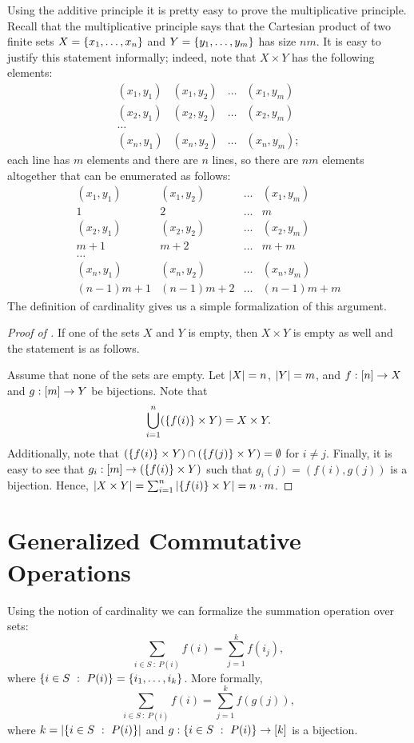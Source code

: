 Using the additive principle it is pretty easy to prove the multiplicative
principle. Recall that the multiplicative principle says that the Cartesian
product of two finite sets $X = \set{x_1, \dots, x_n}$ and 
$Y = \set{y_1, \dots, y_m}$ has size $nm$. It is easy to justify this statement
informally; indeed, note that $X \times Y$ has the following elements:
\[
  \begin{matrix}
    (x_1, y_1) & (x_1, y_2) & \dots & (x_1, y_m) \\
    (x_2, y_1) & (x_2, y_2) & \dots & (x_2, y_m) \\
    \dots \\
    (x_n, y_1) & (x_n, y_2) & \dots & (x_n, y_m);
  \end{matrix}
\]
each line has $m$ elements and there are $n$ lines, so there are $nm$ elements
altogether that can be enumerated as follows:
\[
  \begin{matrix}
    (x_1, y_1) & (x_1, y_2) & \dots & (x_1, y_m) \\
    1          & 2          & \dots & m \\
    (x_2, y_1) & (x_2, y_2) & \dots & (x_2, y_m) \\
    m + 1      & m + 2      & \dots & m + m \\
    \dots \\
    (x_n, y_1) & (x_n, y_2) & \dots & (x_n, y_m) \\
    (n - 1) m + 1 & (n - 1) m + 2 & \dots & (n - 1) m + m
  \end{matrix}
\]
The definition of cardinality gives us a simple formalization of this argument.
\begin{proof}[Proof of ]
  If one of the sets $X$ and $Y$ is empty, then $X \times Y$ is empty as well
  and the statement is as follows.

  Assume that none of the sets are empty. Let $\left|{X}\right| = n$,
  $\left|{Y}\right| = m$, and
  $f : {[{n}]} \to X$ and $g : {[{m}]} \to Y$ be bijections.
  Note that
  \[
    \bigcup_{i = 1}^n (\set{f(i)} \times Y) = X \times Y.
  \]
  Additionally, note that $(\set{f(i)} \times Y) \cap (\set{f(j)} \times Y) =
  \emptyset$ for $i \neq j$. Finally, it is easy to see that $g_i : \range{m} \to
  (\set{f(i)} \times Y)$ such that $g_i(j) = (f(i), g(j))$ is a bijection.
  Hence,
  $\cardinality{X \times Y} = \sum_{i = 1}^n \cardinality{\set{f(i)} \times Y} = n \cdot m$.
\end{proof}


\section{Generalized Commutative Operations}
\label{section:generalized-sum}
Using the notion of cardinality we can formalize the summation operation over
sets:
\[
    \sum_{i \in S ~:~ P(i)} f(i) = \sum_{j = 1}^k f(i_j),
\]
where $\set[P(i)]{i \in S} = \set{i_1, \dots, i_k}$. More formally,
\[
    \sum_{i \in S ~:~ P(i)} f(i) = \sum_{j = 1}^k f(g(j)),
\]
where $k = \cardinality{\set[P(i)]{i \in S}}$ and $g : \set[P(i)]{i \in S} \to \range{k}$ is
a bijection.

